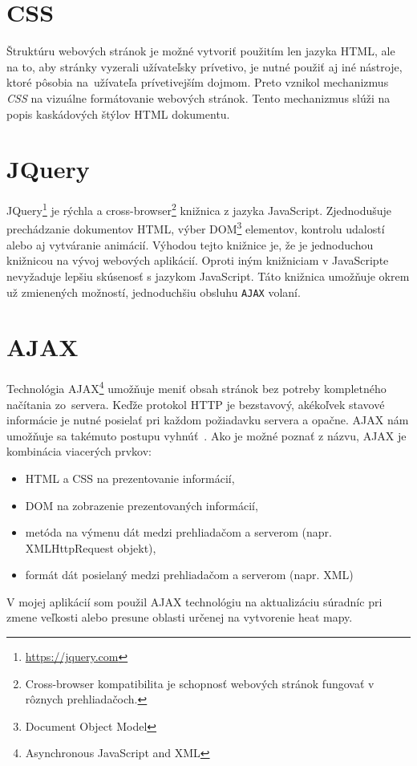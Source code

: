 \section{CSS}
Štruktúru webových stránok je možné vytvoriť použitím len jazyka HTML, ale na to, aby stránky vyzerali užívateľsky prívetivo, je nutné použiť aj iné nástroje, ktoré pôsobia na~užívateľa prívetivejším dojmom. Preto vznikol mechanizmus \emph{CSS} na vizuálne formátovanie webových stránok. Tento mechanizmus slúži na popis kaskádových štýlov HTML dokumentu.


\section{JQuery}
JQuery\footnote{\url{https://jquery.com}} je rýchla a cross-browser\footnote{Cross-browser kompatibilita je schopnosť webových stránok fungovať v rôznych prehliadačoch.} knižnica z jazyka JavaScript. Zjednodušuje prechádzanie dokumentov HTML, výber DOM\footnote{Document Object Model} elementov, kontrolu udalostí alebo aj vytváranie animácií. Výhodou tejto knižnice je, že je jednoduchou knižnicou na vývoj webových aplikácií. Oproti iným knižniciam v JavaScripte nevyžaduje lepšiu skúsenosť s jazykom JavaScript. Táto knižnica umožňuje okrem už zmienených možností, jednoduchšiu obsluhu \texttt{AJAX} volaní.


\section{AJAX}
Technológia AJAX\footnote{Asynchronous JavaScript and XML} umožňuje meniť obsah stránok bez potreby kompletného načítania zo~servera. Keďže protokol HTTP je bezstavový, akékoľvek stavové informácie je nutné posielať pri každom požiadavku servera a opačne. AJAX nám umožňuje sa takémuto postupu vyhnúť~\cite{lacko2008ajax}. Ako je možné poznať z názvu, AJAX je kombinácia viacerých prvkov:
\begin{itemize}
    \item HTML a CSS na prezentovanie informácií,
    \item DOM na zobrazenie prezentovaných informácií,
    \item metóda na výmenu dát medzi prehliadačom a serverom (napr. XMLHttpRequest objekt),
    \item formát dát posielaný medzi prehliadačom a serverom (napr. XML)
\end{itemize}

V mojej aplikácií som použil AJAX technológiu na aktualizáciu súradníc pri zmene veľkosti alebo presune oblasti určenej na vytvorenie heat mapy.



